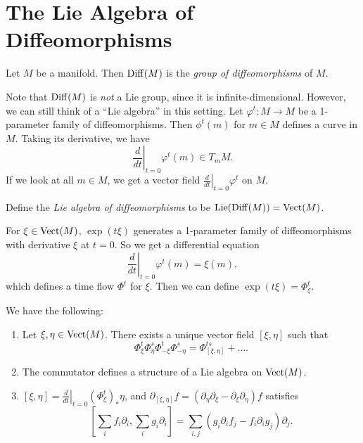 \section{The Lie Algebra of Diffeomorphisms}

\begin{definition}
  Let $M$ be a manifold. Then
  $\operatorname{Diff}(M)$ is the
  \emph{group of diffeomorphisms}
  of $M$.
\end{definition}

\begin{remark}
  Note that $\operatorname{Diff}(M)$ is
  \emph{not} a Lie group, since it
  is infinite-dimensional. However,
  we can still think of a ``Lie algebra''
  in this setting. Let
  $\varphi^t : M \to M$ be a 1-parameter
  family of diffeomorphisms.
  Then $\phi^t(m)$ for $m \in M$
  defines a curve in $M$.
  Taking its derivative, we have
  \[
    \left.\frac{d}{dt}\right|_{t = 0} \varphi^t(m)
      \in T_m M.
  \]
  If we look at all $m \in M$, we
  get a vector field $\left.\frac{d}{dt}\right|_{t = 0} \varphi^t$ on $M$.
\end{remark}

\begin{definition}
  Define
  the \emph{Lie algebra of diffeomorphisms} to be
  $\operatorname{Lie}(\operatorname{Diff}(M)) = \operatorname{Vect}(M)$.
\end{definition}

\begin{remark}
  For $\xi \in \operatorname{Vect}(M)$,
  $\exp(t\xi)$ generates a 1-parameter
  family of diffeomorphisms with
  derivative $\xi$ at $t = 0$. So
  we get a differential equation
  \[
    \left.\frac{d}{dt}\right|_{t = 0} \varphi^t(m)
      = \xi(m),
  \]
  which defines a time flow $\Phi^t$
  for $\xi$.
  Then we can define 
  $\exp(t \xi) = \Phi^t_{\xi}$.
\end{remark}

\begin{prop}\label{prop:commutator}
  We have the following:
  \begin{enumerate}
    \item Let $\xi, \eta \in \operatorname{Vect}(M)$.
      There exists a unique vector
      field $[\xi, \eta]$ such that
      \[
        \Phi^t_{\xi}
        \Phi^s_{\eta}
        \Phi^{t}_{-\xi}
        \Phi^{s}_{-\eta}
      = \Phi^{ts}_{[\xi, \eta]} + \dots.
      \]
    \item The commutator defines a
      structure of a Lie algebra on
      $\operatorname{Vect}(M)$.
    \item $[\xi, \eta] = \left.\frac{d}{dt}\right|_{t = 0} (\Phi^t_{\xi})_* \eta$,
        and $\partial_{[\xi, \eta]} f = (\partial_\eta \partial_\xi - \partial_\xi \partial_\eta) f$
        satisfies
        \[
          \left[\sum_i f_i \partial_i, \sum_i g_i \partial_i\right]
          = \sum_{i, j} (g_i \partial_i f_j - f_i \partial_i g_j) \partial_j.
        \]
  \end{enumerate}
\end{prop}

